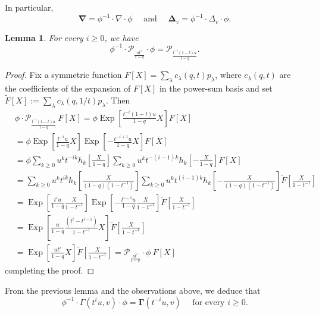 \documentclass[12pt]{amsart}
\newtheorem{lem}[thm]{Lemma}
\theoremstyle{remark}
\newcommand{\nablaJ}{\boldsymbol{\nabla}}
\newcommand{\DeltaJ}{\boldsymbol{\Delta}}
\newcommand{\GammaJ}{\boldsymbol{\Gamma}}
\newcommand{\Pop}{\mathcal{P}}
\DeclareMathOperator{\Exp}{Exp}
\begin{document}
In particular, 
$$\nablaJ=\phi^{-1}\cdot \nabla \cdot\phi \quad \text{ and }\quad\DeltaJ_v=\phi^{-1}\cdot \Delta_v \cdot\phi.$$
\begin{lem}
For every $i\geq 0$, we have
\[\phi^{-1}\cdot \Pop_{\frac{ut^i}{1-q}}\cdot\phi=\Pop_{\frac{t^{-i}(1-t)u}{1-q}}.\]
\end{lem}
\begin{proof}
Fix a symmetric function $F[X]=\sum_{\lambda}c_\lambda(q,t)p_\lambda$, where $c_\lambda(q,t)$ are the coefficients of the expansion of $F[X]$ in the power-sum basis and set $\widetilde F[X]:=\sum_{\lambda}c_\lambda(q,1/t)p_\lambda$. Then
\begin{align*}
& \phi\cdot \Pop_{\frac{t^{-i}(1-t)u}{1-q}}\ F[X] =\phi \Exp\left[\frac{t^{-i}(1-t)u}{1-q}X\right]F[X]\\
& = \phi \Exp\left[\frac{t^{-i}u}{1-q}X\right] \Exp\left[-\frac{t^{-i+1}u}{1-q}X\right]F[X]\\
& = \phi \sum_{k\geq 0}u^kt^{-ik}h_k\left[\frac{X}{1-q}\right] \sum_{k\geq 0}u^kt^{-(i-1)k}h_k\left[-\frac{X}{1-q}\right]F[X]\\
& = \sum_{k\geq 0}u^kt^{ik}h_k\left[\frac{X}{(1-q)(1-t^{-1})}\right] \sum_{k\geq 0}u^kt^{(i-1)k}h_k\left[-\frac{X}{(1-q)(1-t^{-1})}\right]\widetilde F\left[\frac{X}{1-t^{-1}}\right]\\
& = \Exp\left[\frac{t^{i}u}{1-q}\frac{X}{1-t^{-1}}\right] \Exp\left[-\frac{t^{i-1}u}{1-q}\frac{X}{1-t^{-1}}\right]\widetilde F\left[\frac{X}{1-t^{-1}}\right]\\
& = \Exp\left[\frac{u}{1-q}\frac{(t^i-t^{i-1})}{1-t^{-1}}X\right] \widetilde F\left[\frac{X}{1-t^{-1}}\right]\\
&=\Exp\left[\frac{ut^i}{1-q}X\right]\widetilde F\left[\frac{X}{1-t^{-1}}\right]=\Pop_{\frac{ut^i}{1-q}}\cdot\phi\ F[X]
\end{align*}
completing the proof.
\end{proof}
From the previous lemma and the observations above, we deduce that 
\begin{equation}
 \phi^{-1}\cdot \Gamma(t^iu,v)\cdot\phi=\GammaJ(t^{-i}u,v)\quad  \text{ for every }i\geq 0.   
\end{equation}
\end{document}
